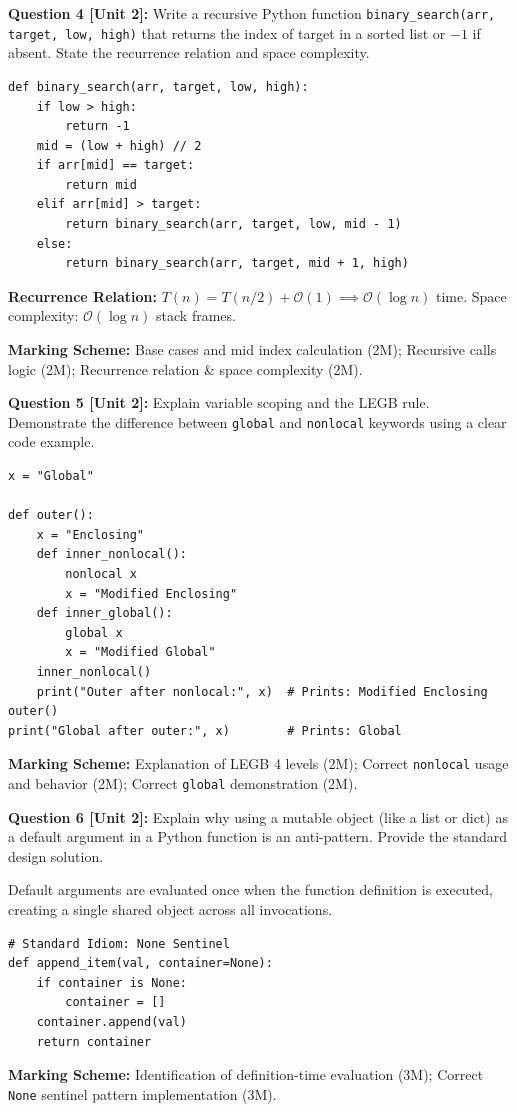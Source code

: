 \noindent\textbf{Question 4 [Unit 2]:} Write a recursive Python function \texttt{binary\_search(arr, target, low, high)} that returns the index of target in a sorted list or $-1$ if absent. State the recurrence relation and space complexity.
\begin{solutionbox}
\begin{lstlisting}
def binary_search(arr, target, low, high):
    if low > high:
        return -1
    mid = (low + high) // 2
    if arr[mid] == target:
        return mid
    elif arr[mid] > target:
        return binary_search(arr, target, low, mid - 1)
    else:
        return binary_search(arr, target, mid + 1, high)
\end{lstlisting}
\textbf{Recurrence Relation:} $T(n) = T(n/2) + \mathcal{O}(1) \implies \mathcal{O}(\log n)$ time. Space complexity: $\mathcal{O}(\log n)$ stack frames.
\end{solutionbox}
\begin{markingrubric}
\textbf{Marking Scheme:} Base cases and mid index calculation (2M); Recursive calls logic (2M); Recurrence relation \& space complexity (2M).
\end{markingrubric}

\noindent\textbf{Question 5 [Unit 2]:} Explain variable scoping and the LEGB rule. Demonstrate the difference between \texttt{global} and \texttt{nonlocal} keywords using a clear code example.
\begin{solutionbox}
\begin{lstlisting}
x = "Global"

def outer():
    x = "Enclosing"
    def inner_nonlocal():
        nonlocal x
        x = "Modified Enclosing"
    def inner_global():
        global x
        x = "Modified Global"
    inner_nonlocal()
    print("Outer after nonlocal:", x)  # Prints: Modified Enclosing
outer()
print("Global after outer:", x)        # Prints: Global
\end{lstlisting}
\end{solutionbox}
\begin{markingrubric}
\textbf{Marking Scheme:} Explanation of LEGB 4 levels (2M); Correct \texttt{nonlocal} usage and behavior (2M); Correct \texttt{global} demonstration (2M).
\end{markingrubric}

\noindent\textbf{Question 6 [Unit 2]:} Explain why using a mutable object (like a list or dict) as a default argument in a Python function is an anti-pattern. Provide the standard design solution.
\begin{solutionbox}
Default arguments are evaluated once when the function definition is executed, creating a single shared object across all invocations.
\begin{lstlisting}
# Standard Idiom: None Sentinel
def append_item(val, container=None):
    if container is None:
        container = []
    container.append(val)
    return container
\end{lstlisting}
\end{solutionbox}
\begin{markingrubric}
\textbf{Marking Scheme:} Identification of definition-time evaluation (3M); Correct \texttt{None} sentinel pattern implementation (3M).
\end{markingrubric}
